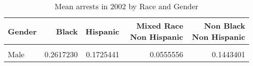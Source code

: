 \begin{table}[H]

\caption{Mean arrests in 2002 by Race and Gender}
\centering
\begin{tabular}[t]{lrrrr}
\toprule
Gender & Black & Hispanic & Mixed Race Non Hispanic & Non Black Non Hispanic\\
\midrule
\cellcolor{gray!6}{Female} & \cellcolor{gray!6}{0.0500481} & \cellcolor{gray!6}{0.0251497} & \cellcolor{gray!6}{0.0967742} & \cellcolor{gray!6}{0.0510659}\\
Male & 0.2617230 & 0.1725441 & 0.0555556 & 0.1443401\\
\bottomrule
\end{tabular}
\end{table}
